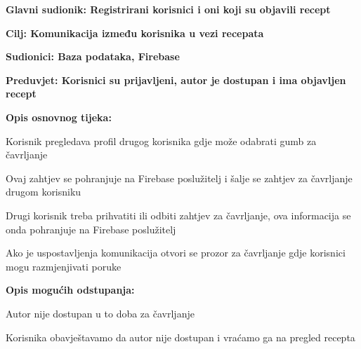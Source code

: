 				\noindent {}
				\begin{packed_item}
					
					\item  \textbf{Glavni sudionik: Registrirani korisnici i oni koji su objavili recept }
					\item  \textbf{Cilj: Komunikacija između korisnika u vezi recepata} 
					\item  \textbf{Sudionici: Baza podataka, Firebase} 
					\item  \textbf{Preduvjet: Korisnici su prijavljeni, autor je dostupan i ima objavljen recept} 
					\item  \textbf{Opis osnovnog tijeka:}
					
					\item[] \begin{packed_enum}
						
						\item Korisnik pregledava profil drugog korisnika gdje može odabrati gumb za čavrljanje 
						\item Ovaj zahtjev se pohranjuje na Firebase poslužitelj i šalje se zahtjev za čavrljanje drugom korisniku
						\item Drugi korisnik treba prihvatiti ili odbiti zahtjev za čavrljanje, ova informacija se onda pohranjuje na Firebase poslužitelj
						\item Ako je uspostavljenja komunikacija otvori se prozor za čavrljanje gdje korisnici mogu razmjenjivati poruke
						
					\end{packed_enum}
					
					\item  \textbf{Opis mogućih odstupanja:}
					
					\item[] \begin{packed_item}
						
						\item[2.a] Autor nije dostupan u to doba za čavrljanje
						\item[] \begin{packed_enum}
							
							\item Korisnika obavještavamo da autor nije dostupan i vraćamo ga na pregled recepta
							
						\end{packed_enum}
						
					\end{packed_item}
				\end{packed_item}
				
